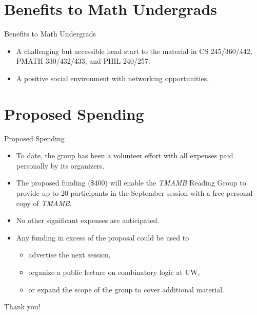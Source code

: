 \documentclass{beamer}
\begin{document}
\section{Benefits to Math Undergrads}
\begin{frame}{Benefits to Math Undergrads}
  \begin{itemize}
  \pause
    \item A challenging but accessible head start to the material in CS 245/360/442, PMATH 330/432/433, and PHIL 240/257. \pause
    \item A positive social environment with networking opportunities. 
  \end{itemize}
\end{frame}

\section{Proposed Spending}
\begin{frame}{Proposed Spending}
  \begin{itemize}
  \pause
    \item To date, the group has been a volunteer effort with all expenses paid personally by its organizers. \pause
    \item The proposed funding (\$400) will enable the \emph{TMAMB} Reading Group to provide up to 20 participants in the September session with a free personal copy of \emph{TMAMB}. \pause
    \item No other significant expenses are anticipated. \pause
    \item Any funding in excess of the proposal could be used to \begin{itemize} \item advertise the next session, \item organize a public lecture on combinatory logic at UW, \item or expand the scope of the group to cover additional material. \end{itemize}
  \end{itemize}
\end{frame}

\begin{frame}{}
  \begin{center}
  \Large Thank you!
  \end{center}
\end{frame}
\end{document}

